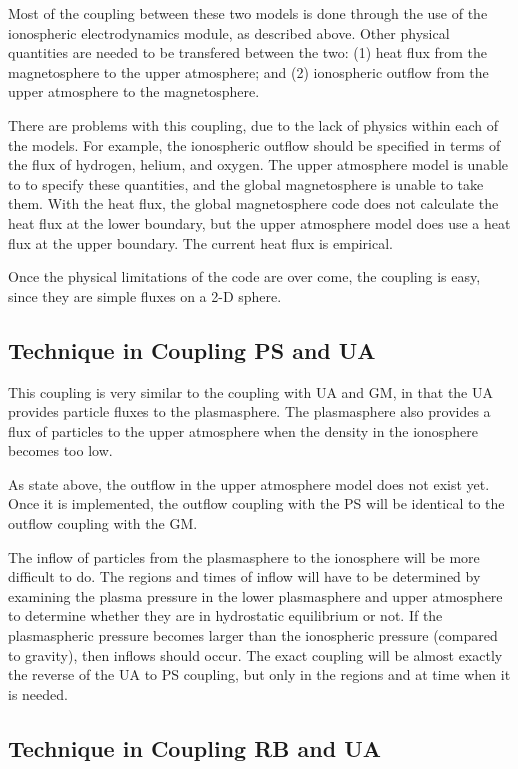Most of the coupling between these two models is done through the use
of the ionospheric electrodynamics module, as described above.  Other
physical quantities are needed to be transfered between the two: (1)
heat flux from the magnetosphere to the upper atmosphere; and (2)
ionospheric outflow from the upper atmosphere to the magnetosphere.

There are problems with this coupling, due to the lack of physics
within each of the models.  For example, the ionospheric outflow
should be specified in terms of the flux of hydrogen, helium, and
oxygen.  The upper atmosphere model is unable to to specify these
quantities, and the global magnetosphere is unable to take them.  With
the heat flux, the global magnetosphere code does not calculate the
heat flux at the lower boundary, but the upper atmosphere model does
use a heat flux at the upper boundary.  The current heat flux is
empirical.

Once the physical limitations of the code are over come, the coupling
is easy, since they are simple fluxes on a 2-D sphere.

\subsection{Technique in Coupling PS and UA}

This coupling is very similar to the coupling with UA and GM, in that
the UA provides particle fluxes to the plasmasphere.  The plasmasphere
also provides a flux of particles to the upper atmosphere when the
density in the ionosphere becomes too low.

As state above, the outflow in the upper atmosphere model does not
exist yet.  Once it is implemented, the outflow coupling with the PS
will be identical to the outflow coupling with the GM.

The inflow of particles from the plasmasphere to the ionosphere will
be more difficult to do.  The regions and times of inflow will have to
be determined by examining the plasma pressure in the lower
plasmasphere and upper atmosphere to determine whether they are in
hydrostatic equilibrium or not.  If the plasmaspheric pressure becomes
larger than the ionospheric pressure (compared to gravity), then
inflows should occur.  The exact coupling will be almost exactly the
reverse of the UA to PS coupling, but only in the regions and at time
when it is needed.

\subsection{Technique in Coupling RB and UA}

